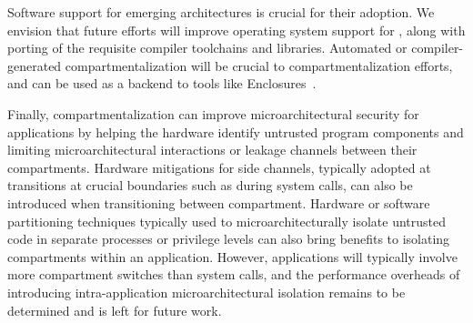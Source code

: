 Software support for emerging architectures is crucial for their adoption.
We envision that future efforts will improve operating system support for
\seccells, along with porting of the requisite compiler toolchains and
libraries.
Automated or compiler-generated compartmentalization will be crucial to
compartmentalization efforts, and \seccells can be used as a backend to
tools like Enclosures~\cite{GhosnKPLB21}.

Finally, compartmentalization can improve microarchitectural security for
applications by helping the hardware identify untrusted program components
and limiting microarchitectural interactions or leakage channels between
their compartments.
Hardware mitigations for side channels, typically adopted at transitions
at crucial boundaries such as during system calls, can also be introduced
when transitioning between compartment.
Hardware or software partitioning techniques typically used to 
microarchitecturally isolate untrusted code in separate processes or privilege
levels can also bring benefits to isolating compartments within an application.
However, applications will typically involve more compartment switches than 
system calls, and the performance overheads of introducing intra-application
microarchitectural isolation remains to be determined and is left for future
work.
